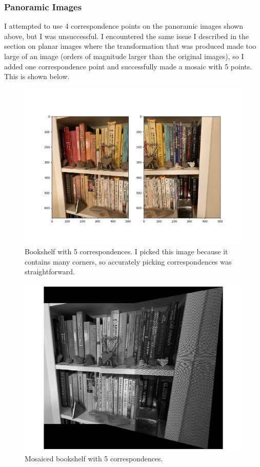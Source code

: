 \documentclass[]{article}
\begin{document}
	\newpage
	
	\subsubsection{Panoramic Images}
	I attempted to use 4 correspondence points on the panoramic images shown above, but I was unsuccessful. I encountered the same issue I described in the section on planar images where the transformation that was produced made too large of an image (orders of magnitude larger than the original images), so I added one correspondence point and successfully made a mosaic with 5 points. This is shown below.
	
	\begin{figure}[H]
		\centering
		\includegraphics[width=6.5in]{test_images/shelf_5_correspondences.png}
		\caption{Bookshelf with 5 correspondences. I picked this image because it contains many corners, so accurately picking correspondences was straightforward.}
	\end{figure}
	
	\begin{figure}[H]
		\centering
		\includegraphics[width=6.5in]{test_images/shelf_5_floor.png}
		\caption{Mosaiced bookshelf with 5 correspondences.}
	\end{figure}
	
\end{document}
